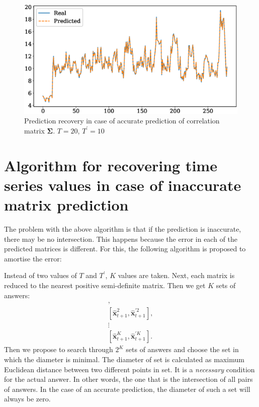 \documentclass{article}
\begin{document}
{\begin{figure}[H]
	\centering
	\includegraphics[width=\textwidth]{IdealRecovery.eps}
	\caption{Prediction recovery in case of accurate prediction of correlation matrix $\mathbf{\Sigma}$. $T=20$, $T^\prime=10$}
	\label{fig:fig3}
\end{figure}

\section{Algorithm for recovering time series values in case of inaccurate matrix prediction}

The problem with the above algorithm is that if the prediction is inaccurate, there may be no intersection. This happens because the error in each of the predicted matrices is different. For this, the following algorithm is proposed to amortise the error:

Instead of two values of $T$ and $T^\prime$, $K$ values are taken.
Next, each matrix is reduced to the nearest positive semi-definite matrix.
Then we get $K$ sets of answers:
\begin{gather*}
	[\hat{\mathbf{x}}_{t+1}^1, \hat{\mathbf{x}}^{\prime 1}_{t+1}],\\
	[\hat{\mathbf{x}}_{t+1}^2, \hat{\mathbf{x}}^{\prime 2}_{t+1}],\\
	\vdots \\
	[\hat{\mathbf{x}}_{t+1}^K, \hat{\mathbf{x}}^{\prime K}_{t+1}].
\end{gather*}
Then we propose to search through $2^K$ sets of answers and choose the set in which the diameter is minimal. The diameter of set is calculated as maximum Euclidean distance between two different points in set. It is a \textit{necessary} condition for the actual answer. In other words, the one that is the intersection of all pairs of answers. In the case of an accurate prediction, the diameter of such a set will always be zero.

}
\end{document}
